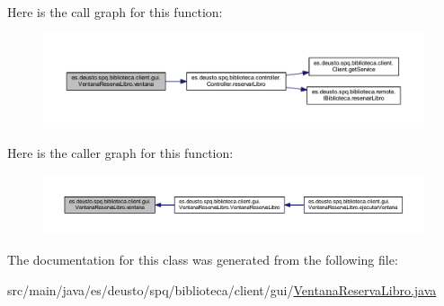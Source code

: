Here is the call graph for this function\+:
\nopagebreak
\begin{figure}[H]
\begin{center}
\leavevmode
\includegraphics[width=350pt]{classes_1_1deusto_1_1spq_1_1biblioteca_1_1client_1_1gui_1_1_ventana_reserva_libro_a91e2a0b1beb4353db52c2b3b8d8a8d1a_cgraph}
\end{center}
\end{figure}
Here is the caller graph for this function\+:
\nopagebreak
\begin{figure}[H]
\begin{center}
\leavevmode
\includegraphics[width=350pt]{classes_1_1deusto_1_1spq_1_1biblioteca_1_1client_1_1gui_1_1_ventana_reserva_libro_a91e2a0b1beb4353db52c2b3b8d8a8d1a_icgraph}
\end{center}
\end{figure}


The documentation for this class was generated from the following file\+:\begin{DoxyCompactItemize}
\item 
src/main/java/es/deusto/spq/biblioteca/client/gui/\mbox{\hyperlink{_ventana_reserva_libro_8java}{Ventana\+Reserva\+Libro.\+java}}\end{DoxyCompactItemize}
